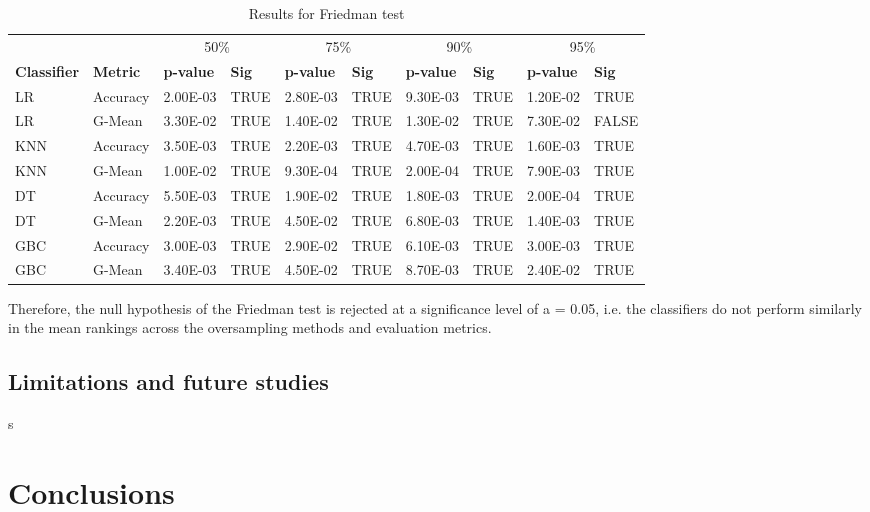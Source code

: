 \documentclass[parskip=full]{scrartcl}
\begin{document}
\begin{table}[H]
	\begin{tabular}{ll|ll|ll|ll|ll}
		&          & \multicolumn{2}{c|}{50\%} & \multicolumn{2}{c|}{75\%} & 
		\multicolumn{2}{c|}{90\%} & \multicolumn{2}{c}{95\%} \\
		\textbf{Classifier} & \textbf{Metric}   & \textbf{p-value}  & 
		\textbf{Sig}  & \textbf{p-value}   & 
		\textbf{Sig}  & \textbf{p-value}   & \textbf{Sig}  & 
		\textbf{p-value}   & \textbf{Sig}  
		\\ \hline
		LR         & Accuracy & 2.00E-03  & TRUE          & 2.80E-03  & 
		TRUE          & 9.30E-03  & TRUE          & 1.20E-02  & TRUE          \\
		LR         & G-Mean   & 3.30E-02  & TRUE          & 1.40E-02  & 
		TRUE          & 1.30E-02  & TRUE          & 7.30E-02  & FALSE         \\
		KNN        & Accuracy & 3.50E-03  & TRUE          & 2.20E-03  & 
		TRUE          & 4.70E-03  & TRUE          & 1.60E-03  & TRUE          \\
		KNN        & G-Mean   & 1.00E-02  & TRUE          & 9.30E-04  & 
		TRUE          & 2.00E-04  & TRUE          & 7.90E-03  & TRUE          \\
		DT         & Accuracy & 5.50E-03  & TRUE          & 1.90E-02  & 
		TRUE          & 1.80E-03  & TRUE          & 2.00E-04  & TRUE          \\
		DT         & G-Mean   & 2.20E-03  & TRUE          & 4.50E-02  & 
		TRUE          & 6.80E-03  & TRUE          & 1.40E-03  & TRUE          \\
		GBC        & Accuracy & 3.00E-03  & TRUE          & 2.90E-02  & 
		TRUE          & 6.10E-03  & TRUE          & 3.00E-03  & TRUE          \\
		GBC        & G-Mean   & 3.40E-03  & TRUE          & 4.50E-02  & 
		TRUE          & 8.70E-03  & TRUE          & 2.40E-02  & TRUE         
	\end{tabular}
\caption{\label{tab:friedman-test}Results for Friedman test}
\end{table}

Therefore, the null hypothesis of the Friedman test is rejected at a 
significance level of a = 0.05, i.e. the classifiers do not perform similarly 
in the mean rankings across the oversampling methods and evaluation metrics.

\subsection{Limitations and future studies}s

\section{Conclusions}



\end{document}

